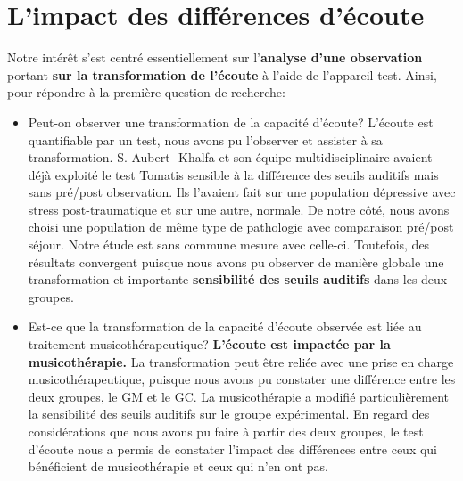  \section{ L'impact des différences d'écoute }
 Notre intérêt s'est centré essentiellement sur l'\textbf{analyse d'une
 	observation}
 portant \textbf{sur la transformation de l'écoute} à l'aide de
 l'appareil test.
  Ainsi, pour répondre à la première question de recherche: 
  \begin{itemize}
       \item Peut-on observer une transformation de la capacité d'écoute?
          L'écoute est quantifiable  par un test, nous avons pu l'observer et  assister à sa
  transformation. 
  S. Aubert -Khalfa et son équipe multidisciplinaire \autocite{affectiveDisorders} avaient déjà
  exploité le test Tomatis  sensible à la différence des
  seuils auditifs mais sans pré/post observation. Ils l'avaient fait sur une population
  dépressive avec stress post-traumatique et sur une autre, normale. De notre côté, nous avons choisi
  une population de même type de pathologie avec comparaison pré/post séjour.
  Notre étude est sans commune mesure avec celle-ci. Toutefois, 
  des résultats convergent puisque nous avons pu observer de manière globale une transformation et 
  importante 
 \textbf{ sensibilité des seuils auditifs} dans les deux groupes. 
 
 	\item Est-ce que la transformation de la capacité d'écoute observée est liée
 au traitement musicothérapeutique? 
  \textbf{L'écoute est impactée par la musicothérapie.} La transformation peut être reliée  avec
 une prise en charge musicothérapeutique, puisque nous avons pu constater une différence entre les 
 deux groupes, le GM et le GC. 
 La musicothérapie a  modifié particulièrement  la  sensibilité des seuils auditifs sur le groupe 
 expérimental.
 En regard des considérations que nous avons pu faire à partir des deux groupes,
 le test d'écoute nous a permis de constater l'impact des différences  entre ceux qui bénéficient de 
 musicothérapie et ceux qui n'en ont pas.
 

\end{itemize}
